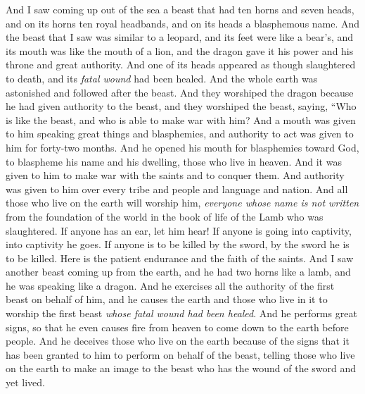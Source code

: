 \begin{biblechapter} %
 And I saw coming up out of the sea a beast that had ten horns and seven heads, and on its horns ten royal headbands, and on its heads a blasphemous name.
\verse And the beast that I saw was similar to a leopard, and its feet were like a bear’s, and its mouth was like the mouth of a lion, and the dragon gave it his power and his throne and great authority.
\verse And one of its heads appeared as though slaughtered to death, and its \textit{fatal wound} had been healed. And the whole earth was astonished and followed after the beast.
\verse And they worshiped the dragon because he had given authority to the beast, and they worshiped the beast, saying, “Who is like the beast, and who is able to make war with him?
\verse And a mouth was given to him speaking great things and blasphemies, and authority to act was given to him for forty-two months.
\verse And he opened his mouth for blasphemies toward God, to blaspheme his name and his dwelling, those who live in heaven.
\verse And it was given to him to make war with the saints and to conquer them. And authority was given to him over every tribe and people and language and nation.
\verse And all those who live on the earth will worship him, \textit{everyone whose name is not written} from the foundation of the world in the book of life of the Lamb who was slaughtered.
\verse If anyone has an ear, let him hear!
\verse If anyone is going into captivity, into captivity he goes. 
If anyone is to be killed by the sword, by the sword he is to be killed. Here is the patient endurance and the faith of the saints.
 And I saw another beast coming up from the earth, and he had two horns like a lamb, and he was speaking like a dragon.
\verse And he exercises all the authority of the first beast on behalf of him, and he causes the earth and those who live in it to worship the first beast \textit{whose fatal wound had been healed}.
\verse And he performs great signs, so that he even causes fire from heaven to come down to the earth before people.
\verse And he deceives those who live on the earth because of the signs that it has been granted to him to perform on behalf of the beast, telling those who live on the earth to make an image to the beast who has the wound of the sword and yet lived.

\end{biblechapter}
